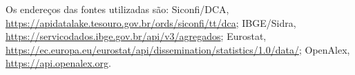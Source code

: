 Os endereços das fontes utilizadas são: Siconfi/DCA, \url{https://apidatalake.tesouro.gov.br/ords/siconfi/tt/dca}; IBGE/Sidra, \url{https://servicodados.ibge.gov.br/api/v3/agregados}; Eurostat, \url{https://ec.europa.eu/eurostat/api/dissemination/statistics/1.0/data/}; OpenAlex, \url{https://api.openalex.org}.
